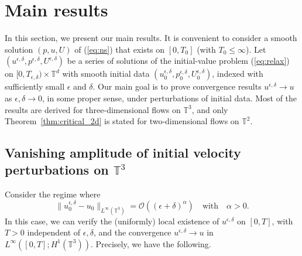 \documentclass[reqno,10pt]{amsart}
\theoremstyle{definition}
\theoremstyle{remark}
\numberwithin{equation}{section}
\begin{document}
\section{Main results} \label{sec:main}
In this section, we present our main results. It is convenient to consider a smooth solution $(p,u,U)$ of (\ref{eq:ns}) that exists on $[0,T_0]$ (with $T_0\le \infty$). Let 
$(u^{\epsilon,\delta},p^{\epsilon,\delta},U^{\epsilon,\delta})$ be a series of solutions of the initial-value problem (\ref{eq:relax}) on $[0,T_{\epsilon,\delta})\times \mathbb T^d$ with smooth initial data $(u_0^{\epsilon,\delta},p_0^{\epsilon,\delta},U_0^{\epsilon,\delta})$, indexed with sufficiently small $\epsilon$ and $\delta$. Our main goal is to prove convergence results $u^{\epsilon,\delta}\to u$ as $\epsilon,\delta\to 0$, in some proper sense, under perturbations of initial data. Most of the results are derived for three-dimensional flows on $\mathbb T^3$, and only Theorem~\ref{thm:critical_2d} is stated for two-dimensional flows on $\mathbb T^2$.

\subsection{Vanishing amplitude of initial velocity perturbations on $\mathbb T^3$} \label{subsec:main_small}

Consider the regime where
\begin{equation} \label{eq:small_Linf} 
    \|u_0^{\epsilon,\delta}-u_0 \|_{L^\infty(\mathbb T^3)}=\mathcal O((\epsilon+\delta)^\alpha) \quad \text{with} \quad \alpha>0.
\end{equation}
In this case, we can verify the (uniformly) local existence of $u^{\epsilon,\delta}$ on $[0,T]$, with $T>0$ independent of $\epsilon,\delta$, and the convergence $u^{\epsilon,\delta}\to u$ in $L^\infty({[0,T]};H^1(\mathbb T^3))$. Precisely, we have the following.
\end{document}
